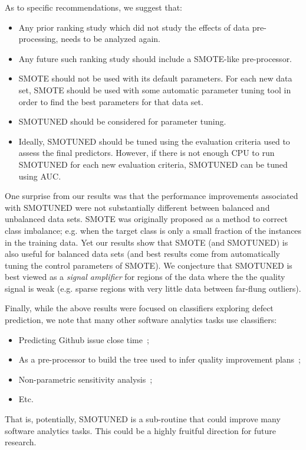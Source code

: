 \documentclass[10pt,conference]{IEEEtran}
\newcommand{\bi}{\begin{itemize}[leftmargin=0.4cm]}
\newcommand{\ei}{\end{itemize}}
\theoremstyle{break}
\theoremstyle{break}
\newcommand{\sma}{{\sc SMOTE}}
\newcommand{\smb}{{\sc SMOTUNED}}
\begin{document}
\noindent
As to specific recommendations,
we suggest that:
\bi
 \item Any prior ranking study  which did not  study the effects of data pre-processing,
 needs to be analyzed again.
 \item Any future such ranking study should include a SMOTE-like
 pre-processor.
 \item SMOTE should not be used with its default parameters.
 For each new data set,
SMOTE should be used with some automatic parameter tuning tool in
order to find the best parameters for that data set.
\item SMOTUNED should be considered for parameter tuning.
\item Ideally, SMOTUNED should be tuned using the evaluation criteria used to assess the final predictors.
However, if there is not enough CPU to run SMOTUNED for each new evaluation criteria, SMOTUNED can be tuned using AUC.
\ei
One surprise from our results was that the performance improvements associated with {\smb} were not substantially different between balanced and unbalanced data sets.
 {\sma} was originally proposed as a method to correct class imbalance; e.g. when the target class is only a small fraction of the instances in the training data.
 Yet our results show that SMOTE (and SMOTUNED) is also useful for balanced data sets (and best results come from automatically tuning the control parameters of SMOTE). We conjecture that SMOTUNED
is best viewed as a   {\em signal amplifier} for regions of the data where the the quality signal is weak  (e.g. sparse regions with very little data between far-flung outliers).


 


Finally, while the above results were focused on classifiers exploring defect prediction, we note that many other software analytics
tasks use classifiers:
\bi
\item Predicting Github issue close time~\cite{jones17};
\item As a pre-processor to build the tree used to 
infer quality improvement plans~\cite{krishna2017less};
\item Non-parametric sensitivity analysis~\cite{menzies2000practical};
\item Etc.
\ei
That is, potentially, SMOTUNED is  a sub-routine that could improve many software analytics tasks. This could be a highly fruitful direction for future research.
\end{document}
